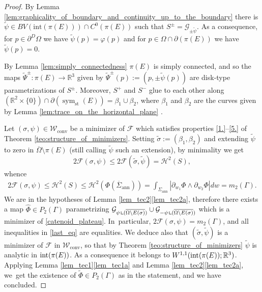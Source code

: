 \documentclass[JEP,XML,SOM,Unicode, NoFloatCountersInSection,published]{cedram}
\DeclareMathOperator{\sym}{sym}
\newcommand{\R}{\mathbb{R}}
\let\Om\Omega
\newcommand\admclassconv{{\mathcal W_\mathrm{conv}}}
\newcommand{\immclosedann}{\Phi({\overline\Sigma}_\mathrm{ann})}
\newcommand{\resa}{\mathop{\hbox{\vrule height 7pt width 0.5pt depth 0pt
\vrule height 0.5pt width 6pt depth 0pt}}\nolimits}
\newcommand{\resb}{\mathop{\hbox{\vrule height 4pt width 0.5pt depth 0pt
\vrule height 0.5pt width 3pt depth 0pt}}\nolimits}
\newcommand{\res}{\mathchoice{\resa}{\resa}{\resb}{\resb}}
\theoremstyle{definition}
\begin{document}
\begin{proof}
By Lemma \ref{lem:graphicality_of_boundary_and_continuity_up_to_the_boundary}
there is $\widetilde \psi\in BV(\mathrm{int}(\pi(E)))\cap C^0(\pi(E))$ such that $S^\pm=
\mathcal {G}_{\pm\widetilde\psi}$.
As a consequence, for $p\in \partial^D\Om$
we have $\widetilde\psi(p)=\varphi(p)$ and for $p\in\Omega\cap \partial (\pi(E))$
we have $\widetilde\psi(p)=0$.

By Lemma \ref{lem:simply_connectedness} $\pi(E)$ is simply connected, and so
the maps $\widetilde \Psi^\pm:\pi(E)\to \R^3$ given by
$\widetilde \Psi^\pm(p):=(p,\pm\widetilde\psi(p))$ are disk-type parametrizations of $S^\pm$.
Moreover, $S^+$ and $S^-$ glue to each other along
$(\R^2\times\{0\})\cap\partial(\sym_\mathrm{st}(E))=
\beta_1\cup\beta_2$, where $\beta_1$ and $\beta_2$
are the curves given by Lemma \ref{lem:trace_on_the_horizontal_plane} .

Let $(\sigma,\psi)\in\admclassconv$ be a minimizer of $\mathcal F$ which satisfies
properties \ref{1.}--\ref{5.} of Theorem \ref{teo:structure_of_minimizers}. Setting $\widetilde\sigma:=(\beta_1,\beta_2)$ and
extending $\widetilde\psi$ to zero in $\overline\Om\setminus \pi(E)$
(still calling $\widetilde \psi$ such an extension),
by minimality we get
\[
2\mathcal F(\sigma,\psi)\leq 2\mathcal F(\widetilde\sigma,\widetilde\psi)=\mathcal H^2(S),
\]
whence
\begin{align}\label{last_eq}
2\mathcal F(\sigma,\psi)\leq \mathcal{H}^2(S)\le\mathcal{H}^2(\immclosedann)
=\int_{\Sigma_{\mathrm{ann}}}|\partial_{w_1}\Phi\wedge\partial_{w_2}\Phi|dw=m_2(\Gamma).
\end{align}
We are in the hypotheses of Lemma \ref{lem_tec2}\ref{lem_tec2a},
therefore there exists a map $\widehat\Phi\in P_2(\Gamma)$ parametrizing $\mathcal G_{\psi\res(\overline{\Om\setminus E(\sigma)})}\cup \mathcal G_{-\psi\res(\overline{\Om\setminus E(\sigma)})}$ which is a minimizer
of \eqref{catenoid_plateau}. In~particular,
$2\mathcal F(\sigma,\psi)=m_2(\Gamma)$, and all inequalities in \eqref{last_eq} are equalities. We
deduce also that
$(\widetilde \sigma,\widetilde\psi)$ is a minimizer of $\mathcal F$ in $\admclassconv$, so that by Theorem \ref{teo:structure_of_minimizers} $\widetilde \psi$ is analytic in $\textup{int}(\pi(E))$. As a consequence it belongs to $W^{1,1}(\textup{int}(\pi(E));\R^3)$.
Applying Lemma \ref{lem_tec1}\ref{lem_tec1a} and Lemma \ref{lem_tec2}\ref{lem_tec2a}, we~get the existence of $\widetilde \Phi\in P_2(\Gamma)$ as in the statement, and we have concluded.
\end{proof}
\end{document}
